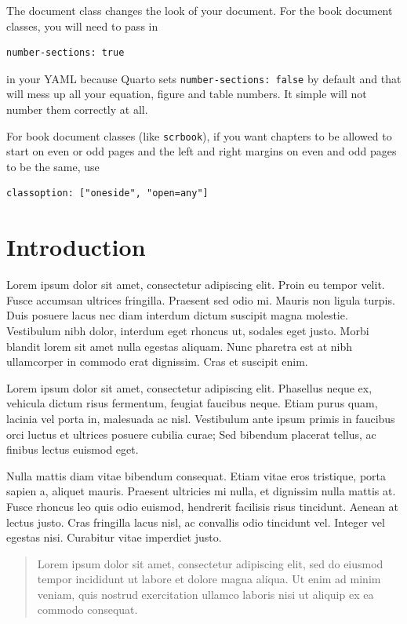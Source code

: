 \documentclass[
  oneside,
  open=any]{scrbook}
\begin{document}
The document class changes the look of your document. For the book
document classes, you will need to pass in

\begin{verbatim}
number-sections: true
\end{verbatim}

in your YAML because Quarto sets \texttt{number-sections:\ false} by
default and that will mess up all your equation, figure and table
numbers. It simple will not number them correctly at all.

For book document classes (like \texttt{scrbook}), if you want chapters
to be allowed to start on even or odd pages and the left and right
margins on even and odd pages to be the same, use

\begin{verbatim}
classoption: ["oneside", "open=any"]
\end{verbatim}

\chapter{Introduction}\label{introduction}

Lorem ipsum dolor sit amet, consectetur adipiscing elit. Proin eu tempor
velit. Fusce accumsan ultrices fringilla. Praesent sed odio mi. Mauris
non ligula turpis. Duis posuere lacus nec diam interdum dictum suscipit
magna molestie. Vestibulum nibh dolor, interdum eget rhoncus ut, sodales
eget justo. Morbi blandit lorem sit amet nulla egestas aliquam. Nunc
pharetra est at nibh ullamcorper in commodo erat dignissim. Cras et
suscipit enim.

Lorem ipsum dolor sit amet, consectetur adipiscing elit. Phasellus neque
ex, vehicula dictum risus fermentum, feugiat faucibus neque. Etiam purus
quam, lacinia vel porta in, malesuada ac nisl. Vestibulum ante ipsum
primis in faucibus orci luctus et ultrices posuere cubilia curae; Sed
bibendum placerat tellus, ac finibus lectus euismod eget.

Nulla mattis diam vitae bibendum consequat. Etiam vitae eros tristique,
porta sapien a, aliquet mauris. Praesent ultricies mi nulla, et
dignissim nulla mattis at. Fusce rhoncus leo quis odio euismod,
hendrerit facilisis risus tincidunt. Aenean at lectus justo. Cras
fringilla lacus nisl, ac convallis odio tincidunt vel. Integer vel
egestas nisi. Curabitur vitae imperdiet justo.

\begin{quote}
Lorem ipsum dolor sit amet, consectetur adipiscing elit, sed do eiusmod
tempor incididunt ut labore et dolore magna aliqua. Ut enim ad minim
veniam, quis nostrud exercitation ullamco laboris nisi ut aliquip ex ea
commodo consequat.\\
\end{quote}
\end{document}
